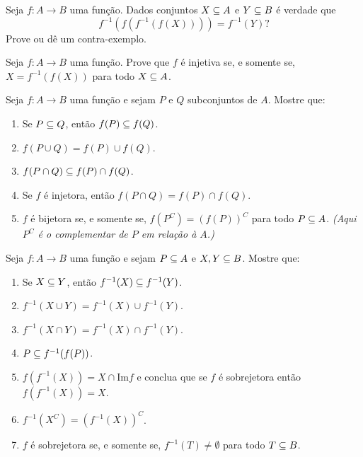 \documentclass[12pt]{exam}
\begin{document}
\vspace{.3cm}

\questao{} Seja $f : A \to B$ uma função. Dados conjuntos $X \subseteq A$ e $Y \subseteq B$ é verdade que
\[
    f^{-1}(f(f^{-1}(f(X)))) = f^{-1}(Y)?
\]
Prove ou dê um contra-exemplo.

\vspace{.3cm}

\questao{} Seja $f : A \to B$ uma função. Prove que $f$ é injetiva se, e somente se, $X = f^{-1}(f(X))$ para todo $X \subseteq A$.

\vspace{.3cm}


\questao{} Seja $f : A \to B$ uma fun\c{c}\~ao e sejam $P$ e $Q$ subconjuntos de $A$. Mostre que:
\begin{enumerate}[label={\alph*})]
    \item Se $P\subseteq Q$, ent{\~a}o $f(P)\subseteq f(Q)$.
    \item $f(P\cup Q) = f(P)\cup f(Q)$.
    \item $f(P\cap Q)\subseteq f(P)\cap f(Q)$.
    \item Se $f$ {\'e} injetora, ent{\~a}o $f(P\cap Q) =  f(P)\cap f(Q)$.
    \item $f$ {\'e} bijetora se, e somente se, $f(P^C) = (f(P))^C$ para todo $P \subseteq A$. \textit{(Aqui $P^C$ \'e o complementar de $P$ em rela\c{c}\~ao \`a $A$.)}
\end{enumerate}

\vspace{.3cm}

\questao{} Seja $f : A \to B$ uma fun{\c c}{\~a}o e sejam $P \subseteq
A$ e $X, Y\subseteq B$. Mostre que:
\begin{enumerate}[label={\alph*})]
    \item Se $X\subseteq Y$, ent{\~a}o $f^{-1}(X)\subseteq f^{-1}(Y)$.
    \item $f^{-1}(X\cup Y)=f^{-1}(X)\cup f^{-1}(Y)$.
    \item $f^{-1}(X\cap Y)= f^{-1}(X)\cap f^{-1}(Y)$.
    \item $P\subseteq f^{-1}(f(P))$.
    \item $f(f^{-1}(X))= X \cap \mbox{Im}f$ e conclua que se $f$ {\'e} sobrejetora ent{\~a}o
    $f(f^{-1}(X))=X$.
    \item $f^{-1}(X^C) = (f^{-1}(X))^C$.
    \item $f$ \'e sobrejetora se, e somente se, $f^{-1}(T) \ne \emptyset$ para todo $T \subseteq B$.
\end{enumerate}
\end{document}
